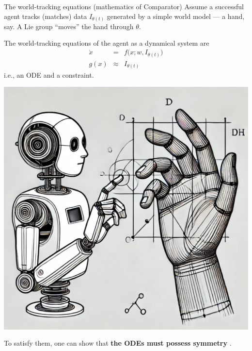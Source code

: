 \begin{frame}{The world-tracking equations (mathematics of Comparator)}
Assume a successful agent tracks (matches) data $I_{\theta (t)}$ generated by a simple world model --- a hand, say. A Lie group ``moves'' the hand through $\theta$. \vfill

\begin{minipage}{0.5\linewidth}
    The world-tracking equations of the agent as a dynamical system are
    \begin{eqnarray*}\label{eq:WTNE} 
        \dot x &=& f\big(x; w, I_{\theta(t)}\big) \nonumber \\
        g(x)  &\approx &I_{\theta (t)}
    \end{eqnarray*}
    i.e., an ODE and a constraint.
\end{minipage}%
\hfill
\begin{minipage}{0.45\linewidth}
    \centering
    \includegraphics[width=0.5\linewidth]{hand.png}
\end{minipage}

\vfill
To satisfy them, one can show that \textbf{the ODEs must possess symmetry} \cite{ruffiniStructuredDynamicsAlgorithmic2023}. 

\end{frame}
